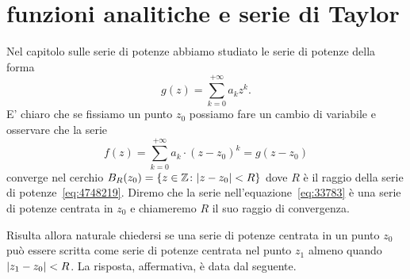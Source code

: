 \section{funzioni analitiche e serie di Taylor}


Nel capitolo sulle serie di potenze abbiamo studiato le serie di potenze
della forma
\begin{equation}\label{eq:4748219}
    g(z) = \sum_{k=0}^{+\infty} a_k z^k.
\end{equation}
E' chiaro che se fissiamo un punto $z_0$ possiamo fare un cambio di variabile
e osservare che la serie
\begin{equation}\label{eq:33783}
  f(z) = \sum_{k=0}^{+\infty} a_k \cdot(z-z_0)^k = g(z-z_0)
\end{equation}
converge nel cerchio $B_R(z_0) = {\left\{ z \in {\mathbb Z}\colon {\left|z-z_0\right|}< R \right\}}$
dove $R$ è il raggio della serie di potenze~\eqref{eq:4748219}.
Diremo che la serie nell'equazione~\eqref{eq:33783} è una
serie di potenze centrata in $z_0$ e chiameremo $R$ il suo raggio di convergenza.

Risulta allora naturale chiedersi se 
una serie di potenze centrata in un punto $z_0$
può essere scritta come serie di potenze centrata 
nel punto $z_1$ almeno quando ${\left|z_1-z_0\right|}<R$.
La risposta, affermativa, è data dal seguente.

